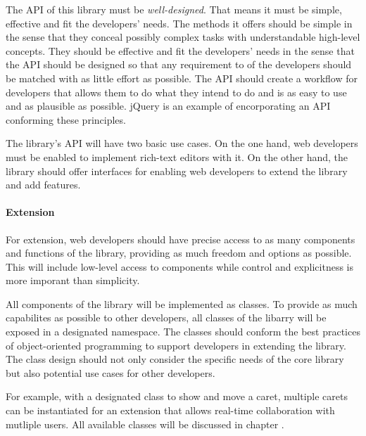 
The API of this library must be \textit{well-designed}. That means it must be simple, effective and fit the developers' needs. The methods it offers should be simple in the sense that they conceal possibly complex tasks with understandable high-level concepts. They should be effective and fit the developers' needs in the sense that the API should be designed so that any requirement to of the developers should be matched with as little effort as possible. The API should create a workflow for developers that allows them to do what they intend to do and is as easy to use and as plausible as possible. jQuery is an example of encorporating an API conforming these principles.

The library's API will have two basic use cases. On the one hand, web developers must be enabled to implement rich-text editors with it. On the other hand, the library should offer interfaces for enabling web developers to extend the library and add features.

\paragraph{Extension}

For extension, web developers should have precise access to as many components and functions of the library, providing as much freedom and options as possible. This will include low-level access to components while control and explicitness is more imporant than simplicity. 

All components of the library will be implemented as classes. To provide as much capabilites as possible to other developers, all classes of the libarry will be exposed in a designated namespace. The classes should conform the best practices of object-oriented programming to support developers in extending the library. The class design should not only consider the specific needs of the core library but also potential use cases for other developers.

For example, with a designated class to show and move a caret, multiple carets can be instantiated for an extension that allows real-time collaboration with mutliple users. All available classes will be discussed in chapter .

